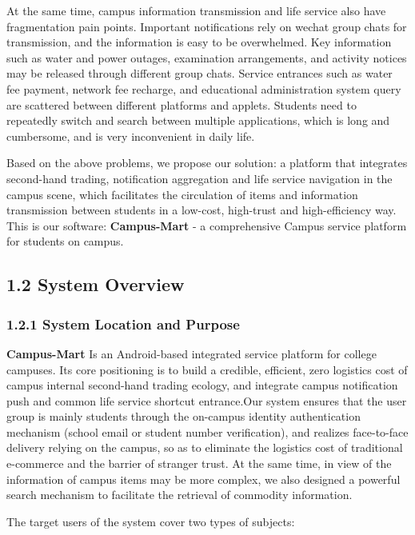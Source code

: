 \documentclass{article}
\begin{document}
At the same time, campus information transmission and life service also have fragmentation pain points. Important notifications rely on wechat group chats for transmission, and the information is easy to be overwhelmed. Key information such as water and power outages, examination arrangements, and activity notices may be released through different group chats. Service entrances such as water fee payment, network fee recharge, and educational administration system query are scattered between different platforms and applets. Students need to repeatedly switch and search between multiple applications, which is long and cumbersome, and is very inconvenient in daily life.

Based on the above problems, we propose our solution: a platform that integrates second-hand trading, notification aggregation and life service navigation in the campus scene, which facilitates the circulation of items and information transmission between students in a low-cost, high-trust and high-efficiency way. This is our software: \textbf{Campus-Mart} - a comprehensive Campus service platform for students on campus.

\subsection{1.2 System Overview}

\subsubsection{1.2.1 System Location and Purpose}

\textbf{Campus-Mart} Is an Android-based integrated service platform for college campuses. Its core positioning is to build a credible, efficient, zero logistics cost of campus internal second-hand trading ecology, and integrate campus notification push and common life service shortcut entrance.Our system ensures that the user group is mainly students through the on-campus identity authentication mechanism (school email or student number verification), and realizes face-to-face delivery relying on the campus, so as to eliminate the logistics cost of traditional e-commerce and the barrier of stranger trust. At the same time, in view of the information of campus items may be more complex, we also designed a powerful search mechanism to facilitate the retrieval of commodity information. 

The target users of the system cover two types of subjects:
\end{document}
